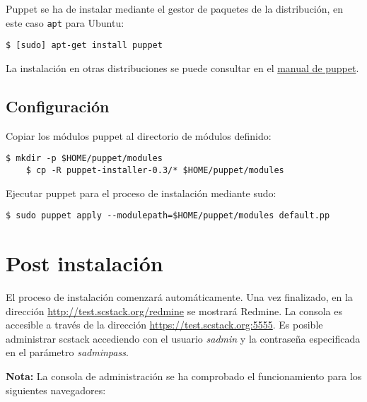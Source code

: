 \par Puppet se ha de instalar mediante el gestor de paquetes de la distribución, en este caso \texttt{apt} para Ubuntu:

\lstset{style=rubybasico}
\begin{lstlisting}[frame=trbl]
    $ [sudo] apt-get install puppet
\end{lstlisting}

\par La instalación en otras distribuciones se puede consultar en el \href{http://docs.puppetlabs.com/guides/installation.html}{manual de puppet}.

\subsection{Configuración}
\label{sub:configuracion-puppet}

\par Copiar los módulos puppet al directorio de módulos definido:

\lstset{style=rubybasico}
\begin{lstlisting}[frame=trbl]
    $ mkdir -p $HOME/puppet/modules
    $ cp -R puppet-installer-0.3/* $HOME/puppet/modules
\end{lstlisting}

\par Ejecutar puppet para el proceso de instalación mediante sudo:

\lstset{style=rubybasico}
\begin{lstlisting}[frame=trbl]
    $ sudo puppet apply --modulepath=$HOME/puppet/modules default.pp
\end{lstlisting}

\section{Post instalación}
\label{sec:post-instalacion}

\par El proceso de instalación comenzará automáticamente. Una vez finalizado, en la dirección
\href{http://test.scstack.org/redmine}{http://test.scstack.org/redmine} se mostrará Redmine. La consola es accesible a través de la dirección \href{https://test.scstack.org:5555}{https://test.scstack.org:5555}. Es posible administrar scstack accediendo con el usuario \emph{sadmin} y la contraseña especificada en el parámetro \emph{sadminpass}.

\par \textbf{Nota:} La consola de administración se ha comprobado el funcionamiento para los siguientes navegadores:


